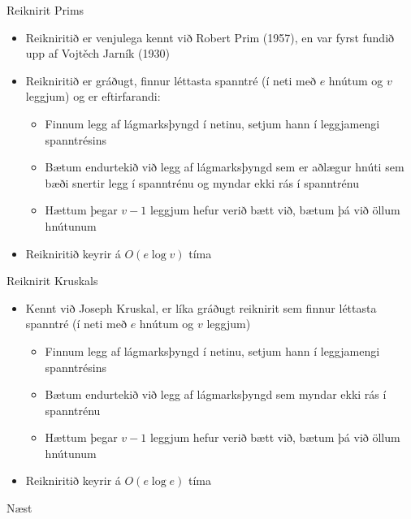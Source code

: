 \documentclass{beamer}
\begin{document}
\begin{frame}{Reiknirit Prims}
\begin{itemize}
 \item Reikniritið er venjulega kennt við Robert Prim (1957), en var fyrst fundið upp af Vojtěch Jarník (1930)
 \item Reikniritið er gráðugt, finnur léttasta spanntré (í neti með $e$ hnútum og $v$ leggjum) og er eftirfarandi:
 \begin{itemize}
  \item Finnum legg af lágmarksþyngd í netinu, setjum hann í leggjamengi spanntrésins
  \item Bætum endurtekið við legg af lágmarksþyngd sem er aðlægur hnúti sem bæði snertir legg í spanntrénu og myndar ekki rás í spanntrénu
  \item Hættum þegar $v-1$ leggjum hefur verið bætt við, bætum þá við öllum hnútunum
 \end{itemize}
 \item Reikniritið keyrir á $O(e \log v)$ tíma
\end{itemize}
\end{frame}

\begin{frame}{Reiknirit Kruskals}
\begin{itemize}
 \item Kennt við Joseph Kruskal, er líka gráðugt reiknirit sem finnur léttasta spanntré (í neti með $e$ hnútum og $v$ leggjum)
 \begin{itemize}
  \item Finnum legg af lágmarksþyngd í netinu, setjum hann í leggjamengi spanntrésins
  \item Bætum endurtekið við legg af lágmarksþyngd sem myndar ekki rás í spanntrénu
  \item Hættum þegar $v-1$ leggjum hefur verið bætt við, bætum þá við öllum hnútunum
 \end{itemize}
 \item Reikniritið keyrir á $O(e \log e)$ tíma
\end{itemize}
\end{frame}

\begin{frame}{Næst}
\end{frame}
\end{document}
